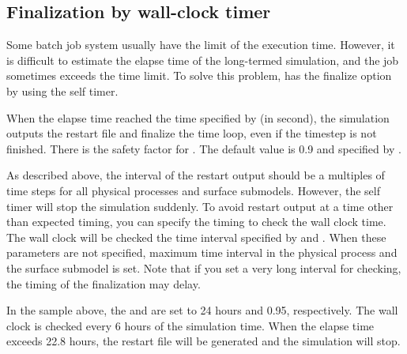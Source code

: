 \subsection{Finalization by wall-clock timer} \label{subsec:wallclock_check}

Some batch job system usually have the limit of the execution time. However, it is difficult to estimate the elapse time of the long-termed simulation, and the job sometimes exceeds the time limit.
To solve this problem, \scalerm has the finalize option by using the self timer.

When the elapse time reached the time specified by  (in second), the simulation outputs the restart file and finalize the time loop, even if the timestep is not finished.
There is the safety factor for . The default value is 0.9 and specified by .


As described above, the interval of the restart output should be a multiples of time steps for all physical processes and surface submodels. However, the self timer will stop the simulation suddenly.
To avoid restart output at a time other than expected timing, you can specify the timing to check the wall clock time.
The wall clock will be checked the time interval specified by  and . When these parameters are not specified, maximum time interval in the physical process and the surface submodel is set.
Note that if you set a very long interval for checking, the timing of the finalization may delay.

 In the sample above, the  and  are set to 24 hours and 0.95, respectively.
The wall clock is checked every 6 hours of the simulation time. When the elapse time exceeds 22.8 hours, the restart file will be generated and the simulation will stop.



